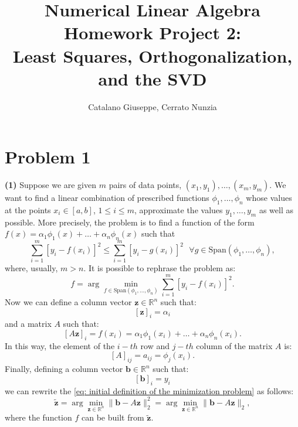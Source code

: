 \documentclass[a4paper,11pt]{article}
\newcommand{\R}{\mathbb{R}}
\begin{document}
\author{Catalano Giuseppe, Cerrato Nunzia}
\title{Numerical Linear Algebra Homework Project 2:\\Least Squares, Orthogonalization, and the SVD}
\date{}
\maketitle

\section*{Problem 1}
\textbf{(1)} Suppose we are given $m$ pairs of data points, $(x_1,y_1),\dots,(x_m,y_m)$. We want to find a linear combination of prescribed functions $\phi_1, \dots, \phi_n$ whose values at the points $x_i \in [a,b] $, $1\le i \le m$, approximate the values $y_1,\dots, y_m$ as well as possible. More precisely, the problem is to find a function of the form $f(x) = \alpha_1 \phi_1(x) + \dots + \alpha_n \phi_n(x) $ such that 
\begin{equation}
	\sum_{i=1}^{m} \left[ y_i - f(x_i) \right]^2 \le \sum_{i=1}^{m} \left[ y_i - g(x_i) \right]^2\ \ \ \forall g \in \text{Span}(\phi_1,\dots,\phi_n),
\end{equation}
where, usually, $m>n$. It is possible to rephrase the problem as:
\begin{equation}\label{eq: initial definition of the minimization problem}
	f = \arg \min_{f\in \text{Span}(\phi_1,\dots,\phi_n)} \sum_{i=1}^{m} \left[ y_i - f(x_i) \right]^2.
\end{equation}
Now we can define a column vector $\textbf{z} \in \R^n$ such that:
\begin{equation}\label{key}
	[\textbf{z}]_i = \alpha_i
\end{equation}
and a matrix $A$ such that:
\begin{equation}\label{key}
	[A\textbf{z}]_i = f(x_i) = \alpha_1 \phi_1(x_i) + \dots + \alpha_n \phi_n(x_i).
\end{equation}
In this way, the element of the $i-th$ row and $j-th$ column of the matrix $A$ is:
\begin{equation}\label{key}
	[A]_{ij} = a_{ij} = \phi_j(x_i).
\end{equation}
Finally, defining a column vector $\textbf{b} \in \R^n$ such that:
\begin{equation}\label{key}
	[\textbf{b}]_i = y_i
\end{equation}
we can rewrite the \eqref{eq: initial definition of the minimization problem} as follows:
\begin{equation}\label{key}
	\tilde{\textbf{z}} = \arg \min_{\textbf{z}\in \R^n} \lVert \textbf{b} - A \textbf{z} \rVert_2^2 =  \arg \min_{\textbf{z}\in \R^n} \lVert \textbf{b} - A \textbf{z} \rVert_2,
\end{equation}
where the function $f$ can be built from $\tilde{\textbf{z}}$.
\end{document}
